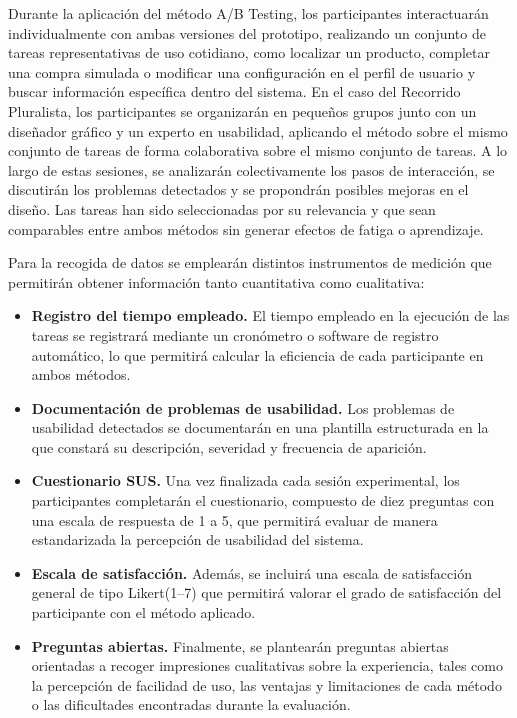 \documentclass[a4paper,12pt]{report}
\begin{document}
Durante la aplicación del método A/B Testing, los participantes interactuarán individualmente con ambas versiones del prototipo, 
realizando un conjunto de tareas representativas de uso cotidiano, como localizar un producto, completar una compra simulada o modificar una 
configuración en el perfil de usuario y buscar información específica dentro del sistema. En el caso del Recorrido Pluralista, los 
participantes se organizarán en pequeños grupos junto con un diseñador gráfico y un experto en usabilidad, aplicando el método 
sobre el mismo conjunto de tareas de forma colaborativa sobre el mismo conjunto de tareas. A lo largo de estas sesiones, se analizarán colectivamente 
los pasos de interacción, se discutirán los problemas detectados y se propondrán posibles mejoras en el diseño. Las tareas han sido seleccionadas por su 
relevancia y que sean comparables entre ambos métodos sin generar efectos de fatiga o aprendizaje. 


Para la recogida de datos se emplearán distintos instrumentos de medición que permitirán obtener información tanto cuantitativa como cualitativa: 

\begin{itemize}
    \item \textbf{Registro del tiempo empleado.} El tiempo empleado en la ejecución de las tareas se registrará mediante un cronómetro o software de registro automático, lo que permitirá calcular la eficiencia de cada participante en ambos métodos. 
    \item \textbf{Documentación de problemas de usabilidad.} Los problemas de usabilidad detectados se documentarán en una plantilla estructurada en la que constará su descripción, severidad y frecuencia de aparición.
    \item \textbf{Cuestionario SUS.} Una vez finalizada cada sesión experimental, los participantes completarán el cuestionario, compuesto de diez preguntas con una escala de respuesta de 1 a 5, que permitirá evaluar de manera estandarizada la percepción de usabilidad del sistema.
    \item \textbf{Escala de satisfacción.} Además, se incluirá una escala de satisfacción general de tipo Likert(1--7) que permitirá valorar el grado de satisfacción del participante con el método aplicado.
    \item \textbf{Preguntas abiertas.} Finalmente, se plantearán preguntas abiertas orientadas a recoger impresiones cualitativas sobre la experiencia, tales como la percepción de facilidad de uso, las ventajas y limitaciones de cada método o las dificultades encontradas durante la evaluación.  
\end{itemize}
\end{document}
